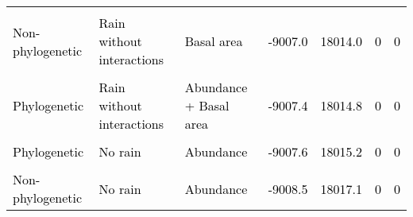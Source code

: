 \documentclass[
  12pt,
  letterpaper,
  DIV=11,
  numbers=noendperiod]{scrartcl}
\begin{document}
\begin{table}[H]
{\begin{tabular}[t]{lllllll}
\cellcolor{gray!6}{\textcolor{black}{Phylogenetic}} & \cellcolor{gray!6}{\textcolor{black}{Rain with an interaction of conspecific densities}} & \cellcolor{gray!6}{\textcolor{black}{Abundance + Basal area}} & \cellcolor{gray!6}{\textcolor{black}{-9006.2}} & \cellcolor{gray!6}{\textcolor{black}{18012.5}} & \cellcolor{gray!6}{\textcolor{black}{0}} & \cellcolor{gray!6}{\textcolor{black}{0}}\\
\addlinespace
\textcolor{black}{Non-phylogenetic} & \textcolor{black}{Rain without interactions} & \textcolor{black}{Basal area} & \textcolor{black}{-9007.0} & \textcolor{black}{18014.0} & \textcolor{black}{0} & \textcolor{black}{0}\\
\cellcolor{gray!6}{\textcolor{black}{Phylogenetic}} & \cellcolor{gray!6}{\textcolor{black}{No rain}} & \cellcolor{gray!6}{\textcolor{black}{Basal area}} & \cellcolor{gray!6}{\textcolor{black}{-9007.4}} & \cellcolor{gray!6}{\textcolor{black}{18014.8}} & \cellcolor{gray!6}{\textcolor{black}{0}} & \cellcolor{gray!6}{\textcolor{black}{0}}\\
\textcolor{black}{Phylogenetic} & \textcolor{black}{Rain without interactions} & \textcolor{black}{Abundance + Basal area} & \textcolor{black}{-9007.4} & \textcolor{black}{18014.8} & \textcolor{black}{0} & \textcolor{black}{0}\\
\cellcolor{gray!6}{\textcolor{black}{Non-phylogenetic}} & \cellcolor{gray!6}{\textcolor{black}{Rain without interactions}} & \cellcolor{gray!6}{\textcolor{black}{Abundance + Basal area}} & \cellcolor{gray!6}{\textcolor{black}{-9007.6}} & \cellcolor{gray!6}{\textcolor{black}{18015.2}} & \cellcolor{gray!6}{\textcolor{black}{0}} & \cellcolor{gray!6}{\textcolor{black}{0}}\\
\textcolor{black}{Phylogenetic} & \textcolor{black}{No rain} & \textcolor{black}{Abundance} & \textcolor{black}{-9007.6} & \textcolor{black}{18015.2} & \textcolor{black}{0} & \textcolor{black}{0}\\
\addlinespace
\cellcolor{gray!6}{\textcolor{black}{Non-phylogenetic}} & \cellcolor{gray!6}{\textcolor{black}{No rain}} & \cellcolor{gray!6}{\textcolor{black}{Basal area}} & \cellcolor{gray!6}{\textcolor{black}{-9008.1}} & \cellcolor{gray!6}{\textcolor{black}{18016.3}} & \cellcolor{gray!6}{\textcolor{black}{0}} & \cellcolor{gray!6}{\textcolor{black}{0}}\\
\textcolor{black}{Non-phylogenetic} & \textcolor{black}{No rain} & \textcolor{black}{Abundance} & \textcolor{black}{-9008.5} & \textcolor{black}{18017.1} & \textcolor{black}{0} & \textcolor{black}{0}\\

\end{tabular}}
\end{table}
\end{document}
